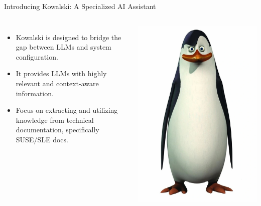 \documentclass[aspectratio=169]{beamer}
\begin{document}
\begin{frame}{Introducing Kowalski: A Specialized AI Assistant}
\begin{columns}
  \begin{itemize}
    \item Kowalski is designed to bridge the gap between LLMs and system configuration.
    \item It provides LLMs with highly relevant and context-aware information.
    \item Focus on extracting and utilizing knowledge from technical documentation, specifically SUSE/SLE docs.
  \end{itemize}
  \includegraphics[width=\linewidth]{Kowalski}
\end{columns}
\end{frame}
\end{document}
